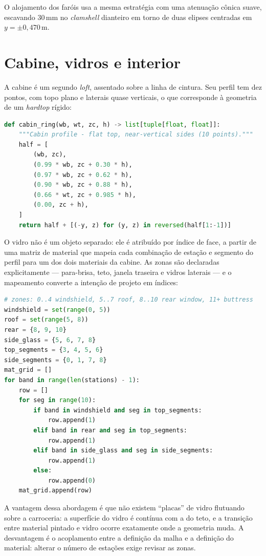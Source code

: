 O alojamento dos far\'ois usa a mesma estrat\'egia com uma atenua{\c{c}}\~ao c\^onica
suave, escavando $30$\,mm no \emph{clamshell} dianteiro em torno de duas elipses
centradas em $y = \pm0,470$\,m.

\section{Cabine, vidros e interior}\label{sec:cabine}

A cabine \'e um segundo \emph{loft}, assentado sobre a linha de cintura. Seu perfil tem dez
pontos, com topo plano e laterais quase verticais, o que corresponde \`a geometria de um
\emph{hardtop} r\'igido:

\begin{lstlisting}[language=Python]
def cabin_ring(wb, wt, zc, h) -> list[tuple[float, float]]:
    """Cabin profile - flat top, near-vertical sides (10 points)."""
    half = [
        (wb, zc),
        (0.99 * wb, zc + 0.30 * h),
        (0.97 * wb, zc + 0.62 * h),
        (0.90 * wb, zc + 0.88 * h),
        (0.66 * wt, zc + 0.985 * h),
        (0.00, zc + h),
    ]
    return half + [(-y, z) for (y, z) in reversed(half[1:-1])]
\end{lstlisting}

O vidro n\~ao \'e um objeto separado: ele \'e atribu\'ido por \'indice de face, a partir de uma
matriz de material que mapeia cada combina{\c{c}}\~ao de esta{\c{c}}\~ao e segmento do perfil
para um dos dois materiais da cabine. As zonas s\~ao declaradas explicitamente ---
para-brisa, teto, janela traseira e vidros laterais --- e o mapeamento converte a
inten{\c{c}}\~ao de projeto em \'indices:

\begin{lstlisting}[language=Python]
# zones: 0..4 windshield, 5..7 roof, 8..10 rear window, 11+ buttress
windshield = set(range(0, 5))
roof = set(range(5, 8))
rear = {8, 9, 10}
side_glass = {5, 6, 7, 8}
top_segments = {3, 4, 5, 6}
side_segments = {0, 1, 7, 8}
mat_grid = []
for band in range(len(stations) - 1):
    row = []
    for seg in range(10):
        if band in windshield and seg in top_segments:
            row.append(1)
        elif band in rear and seg in top_segments:
            row.append(1)
        elif band in side_glass and seg in side_segments:
            row.append(1)
        else:
            row.append(0)
    mat_grid.append(row)
\end{lstlisting}

A vantagem dessa abordagem \'e que n\~ao existem ``placas'' de vidro flutuando sobre a
carroceria: a superf\'icie do vidro \'e cont\'inua com a do teto, e a transi{\c{c}}\~ao entre
material pintado e vidro ocorre exatamente onde a geometria muda. A desvantagem \'e o
acoplamento entre a defini{\c{c}}\~ao da malha e a defini{\c{c}}\~ao do material: alterar o
n\'umero de esta{\c{c}}\~oes exige revisar as zonas.

